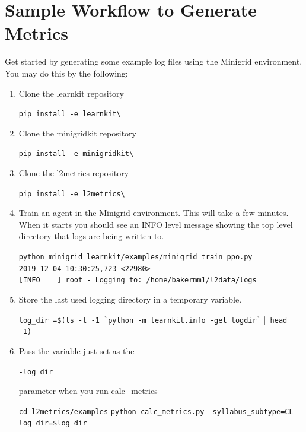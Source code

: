 \section{Sample Workflow to Generate Metrics}

Get started by generating some example log files using the Minigrid environment. You may do this by the following:\\[0.2in]

\begin{enumerate}

\item Clone the learnkit repository\\
\begin{small}
\verb|pip install -e learnkit\|\\[0.1in]
\end{small}

\item Clone the minigridkit repository\\
\begin{small}
\verb|pip install -e minigridkit\|\\[0.1in]
\end{small}

\item Clone the l2metrics repository\\
\begin{small}
\verb|pip install -e l2metrics\|\\[0.1in]
\end{small}

\item Train an agent in the Minigrid environment. This will take a few minutes. When it starts you should see an INFO level message showing the top level directory that logs are being written to.\\[0.1in]
\begin{small}
\verb|python minigrid_learnkit/examples/minigrid_train_ppo.py| \\
\verb|2019-12-04 10:30:25,723 <22980> | \\
\verb|[INFO    ] root - Logging to: /home/bakermm1/l2data/logs|\\[0.1in]
\end{small}

\item Store the last used logging directory in a temporary variable.\\
\begin{small}
\verb|log_dir =$(ls -t -1 `python -m learnkit.info -get logdir`| |\verb| head -1)|\\[0.1in]
\end{small}
\item Pass the variable just set as the 
\begin{small}
\verb|-log_dir|
\end{small}parameter when you run calc\_metrics\\
\begin{small}
\verb|cd l2metrics/examples|
\verb|python calc_metrics.py -syllabus_subtype=CL -log_dir=$log_dir|\\[0.2in]
\end{small}
\end{enumerate}
